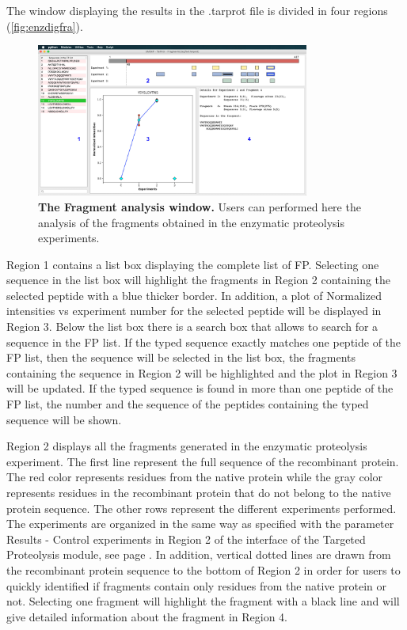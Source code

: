 The window displaying the results in the .tarprot file is divided in four regions (\autoref{fig:enzdigfra}).

\begin{figure}[h]
	\centering
	\includegraphics[width=0.8\textwidth]{./IMAGES/MOD-TARPROT/tarprot-frag.jpg}	    
	\caption[The Fragment analysis window]{\textbf{The Fragment analysis window.} Users can performed here the analysis of the fragments obtained in the enzymatic proteolysis experiments.} 
	\label{fig:enzdigfra}
	\vspace{-5pt} 	
\end{figure} 

Region \num{1} contains a list box displaying the complete list of FP. Selecting one sequence in the list box will highlight the fragments in Region \num{2} containing the selected peptide with a blue thicker border. In addition, a plot of Normalized intensities vs experiment number for the selected peptide will be displayed in Region \num{3}. Below the list box there is a search box that allows to search for a sequence in the FP list. If the typed sequence exactly matches one peptide of the FP list, then the sequence will be selected in the list box, the fragments containing the sequence in Region \num{2} will be highlighted and the plot in Region \num{3} will be updated. If the typed sequence is found in more than one peptide of the FP list, the number and the sequence of the peptides containing the typed sequence will be shown.

Region \num{2} displays all the fragments generated in the enzymatic proteolysis experiment. The first line represent the full sequence of the recombinant protein. The red color represents residues from the native protein while the gray color represents residues in the recombinant protein that do not belong to the native protein sequence. The other rows represent the different experiments performed. The experiments are organized in the same way as specified with the parameter Results - Control experiments in Region \num{2} of the interface of the Targeted Proteolysis module, see page \pageref{par:results}. In addition, vertical dotted lines are drawn from the recombinant protein sequence to the bottom of Region \num{2} in order for users to quickly identified if fragments contain only residues from the native protein or not. Selecting one fragment will highlight the fragment with a black line and will give detailed information about the fragment in Region \num{4}. 

